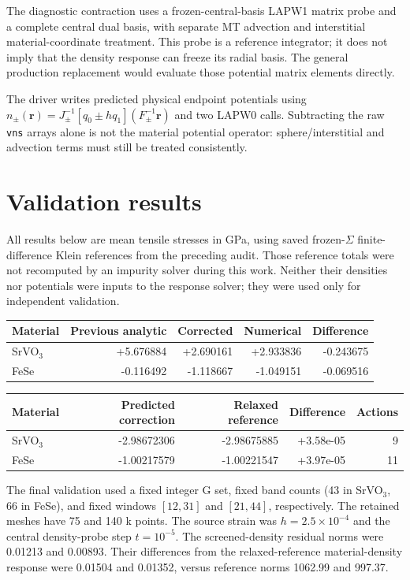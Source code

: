 \documentclass[11pt]{article}
\begin{document}
The diagnostic contraction uses a frozen-central-basis LAPW1 matrix probe
and a complete central dual basis, with separate MT advection and
interstitial material-coordinate treatment. This probe is a reference
integrator; it does not imply that the density response can freeze its
radial basis. The general production replacement would evaluate those
potential matrix elements directly.

The driver writes predicted physical endpoint potentials using
$n_\pm(\mathbf r)=J_\pm^{-1}[q_0\pm hq_1](F_\pm^{-1}\mathbf r)$ and two
LAPW0 calls. Subtracting the raw \texttt{vns} arrays alone is not the
material potential operator: sphere/interstitial and advection terms
must still be treated consistently.

\section{Validation results}
All results below are mean tensile stresses in GPa, using saved
frozen-$\Sigma$ finite-difference Klein references from the preceding audit.
Those reference totals were not recomputed by an impurity solver during this
work. Neither their densities nor potentials were inputs to the response
solver; they were used only for independent validation.

\begin{center}\small
\begin{tabular}{lrrrr}\toprule
Material & Previous analytic & Corrected & Numerical & Difference\\\midrule
SrVO$_3$ & +5.676884 & +2.690161 & +2.933836 & -0.243675 \\
FeSe & -0.116492 & -1.118667 & -1.049151 & -0.069516 \\
\bottomrule\end{tabular}\end{center}

\begin{center}\small
\begin{tabular}{lrrrr}\toprule
Material & Predicted correction & Relaxed reference & Difference & Actions\\\midrule
SrVO$_3$ & -2.98672306 & -2.98675885 & +3.58e-05 & 9 \\
FeSe & -1.00217579 & -1.00221547 & +3.97e-05 & 11 \\
\bottomrule\end{tabular}\end{center}

The final validation used a fixed integer G set, fixed band
counts (43 in SrVO$_3$, 66 in FeSe), and fixed windows $[12,31]$ and
$[21,44]$, respectively. The retained meshes have 75 and 140 k points.
The source strain was $h=2.5\times10^{-4}$ and the central density-probe
step $t=10^{-5}$. The screened-density residual norms were 0.01213 and
0.00893. Their differences from the relaxed-reference material-density
response were 0.01504 and 0.01352, versus reference norms 1062.99 and 997.37.
\end{document}
